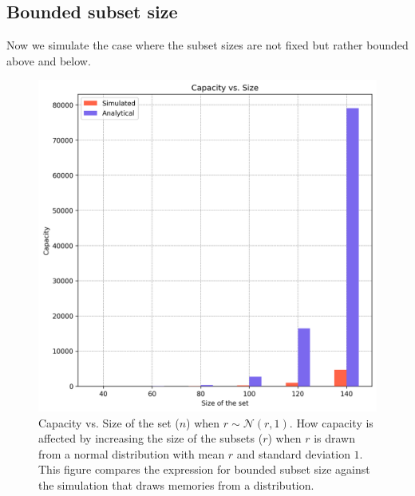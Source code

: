 \subsection{Bounded subset size}
Now we simulate the case where the subset sizes are not fixed but rather bounded above and below. 

\begin{figure}%
    \centering
    \includegraphics[scale=0.82]{figures/cap-vs-n-bounded.png}
    \caption[Capacity vs. Size of the set ($n$) when $r \sim \mathcal{N}(r,1)$]{Capacity vs. Size of the set ($n$) when $r \sim \mathcal{N}(r,1)$. \textmd{How capacity is affected by increasing the size of the subsets ($r$) when $r$ is drawn from a normal distribution with mean $r$ and standard deviation $1$. This figure compares the expression for bounded subset size against the simulation that draws memories from a distribution.}}
    \label{figure:cap-vs-n-bounded}
    \end{figure}


